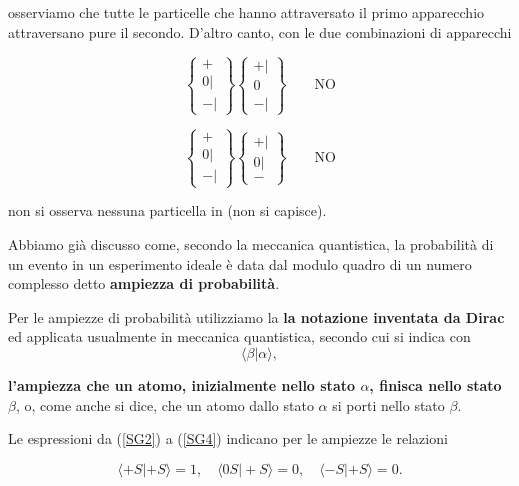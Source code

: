 osserviamo che tutte le particelle che hanno attraversato il primo apparecchio attraversano pure il secondo. D'altro canto, con le due combinazioni di apparecchi

\begin{equation}
\begin{Bmatrix}
 + \\ 0 | \\ - |  
\end{Bmatrix}
\begin{Bmatrix}
 + |  \\ 0  \\ - |  
\end{Bmatrix} \qquad \text{NO}
\label{SG3}
\end{equation}

\begin{equation}
\begin{Bmatrix}
 + \\ 0 | \\ - |  
\end{Bmatrix}
\begin{Bmatrix}
 + |  \\ 0|  \\ -  
\end{Bmatrix} \qquad \text{NO}
\label{SG4}
\end{equation}

non si osserva nessuna particella in (non si capisce).

Abbiamo già discusso come, secondo la meccanica quantistica, la probabilità di un evento in un esperimento ideale è data dal modulo quadro di un numero complesso detto \textbf{ampiezza di probabilità}.

Per le ampiezze di probabilità utilizziamo la \textbf{la notazione inventata da Dirac} ed applicata usualmente in meccanica quantistica, secondo cui si indica con 
\begin{equation}
\langle\beta |\alpha \rangle ,
\end{equation} 

\textbf{l'ampiezza che un atomo, inizialmente nello stato $\alpha$, finisca nello stato $\beta$}, o, come anche si dice, che un atomo dallo stato $\alpha$ si porti nello stato $\beta$.

Le espressioni da (\ref{SG2}) a (\ref{SG4}) indicano per le ampiezze le relazioni

\begin{equation}
\langle +S |+S \rangle =1, \quad \langle 0S | +S \rangle =0, \quad \langle -S | +S \rangle=0 .
 \label{cap3_1}
\end{equation} 

